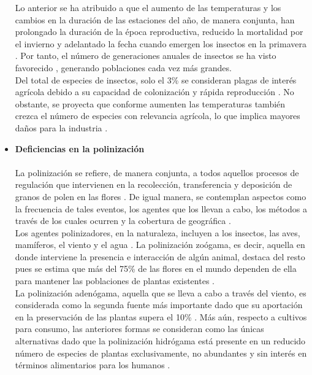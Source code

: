 \begin{itemize}[leftmargin=0cm, itemsep=0.5 cm]
{	
	Lo anterior se ha atribuido a que el aumento de las temperaturas y los cambios en la duración de las estaciones del año, de manera conjunta, han prolongado la duración de la época reproductiva, reducido la mortalidad por el invierno y adelantado la fecha cuando emergen los insectos en la primavera \cite{Kiritani_2013}. Por tanto, el número de generaciones anuales de insectos se ha visto favorecido \cite{Harvey_2022}, generando poblaciones cada vez más grandes.\\
	
	Del total de especies de insectos, solo el 3\% se consideran plagas de interés agrícola debido a su capacidad de colonización y rápida reproducción \cite{Garcia-Lara_2016}. No obstante, se proyecta que conforme aumenten las temperaturas también crezca el número de especies con relevancia agrícola, lo que implica mayores daños para la industria \cite{Deutsch_2018}.
	}
	\item[]\textbf{Deficiencias en la polinización\\}\\
	{La polinización se refiere, de manera conjunta, a todos aquellos procesos de regulación que intervienen en la recolección, transferencia y deposición de granos de polen en las flores \cite{Liss_2013}. De igual manera, se contemplan aspectos como la frecuencia de tales eventos, los agentes que los llevan a cabo, los métodos a través de los cuales ocurren y la cobertura de geográfica \cite{Carvalheiro_2010, Westerkamp_2000}.\\
	
	Los agentes polinizadores, en la naturaleza, incluyen a los insectos, las aves, mamíferos, el viento y el agua \cite{Amrutwad_2024}. La polinización zoógama, es decir, aquella en donde interviene la presencia e interacción de algún animal, destaca del resto pues se estima que más del 75\% de las flores en el mundo dependen de ella para mantener las poblaciones de plantas existentes \cite{Ollerton_2011}.\\
	
	La polinización adenógama, aquella que se lleva a cabo a través del viento, es considerada como la segunda fuente más importante dado que su aportación en la preservación de las plantas supera el 10\% \cite{Friedman_2009}. Más aún, respecto a cultivos para consumo, las anteriores formas se consideran como las únicas alternativas dado que la polinización hidrógama está presente en un reducido número de especies de plantas exclusivamente, no abundantes y sin interés en términos alimentarios para los humanos \cite{Clemente_2023}.\\
	
}
\end{itemize}
